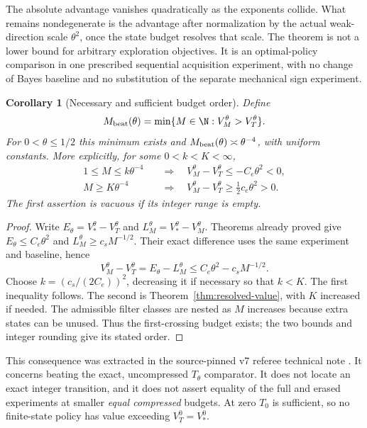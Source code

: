 \documentclass[11pt]{amsart}
\newtheorem{corollary}[theorem]{Corollary}
\theoremstyle{definition}\newtheorem{definition}[theorem]{Definition}
\theoremstyle{remark}\newtheorem{remark}[theorem]{Remark}
\begin{document}
The absolute advantage vanishes quadratically as the exponents collide.
What remains nondegenerate is the advantage after normalization by the
actual weak-direction scale $\theta^2$, once the state budget resolves
that scale. The theorem is not a lower bound for arbitrary exploration
objectives. It is an optimal-policy comparison in one prescribed
sequential acquisition experiment, with no change of Bayes baseline and
no substitution of the separate mechanical sign experiment.


\begin{corollary}[Necessary and sufficient budget order]\label{cor:necessary-budget}
Define
\[
 M_{\rm beat}(\theta)=\min\{M\in\N:V_M^\theta>V_T^\theta\}.
\]
For $0<\theta\le1/2$ this minimum exists and
$M_{\rm beat}(\theta)\asymp\theta^{-4}$, with uniform constants.
More explicitly, for some $0<k<K<\infty$,
\[
 \begin{aligned}
 1\le M\le k\theta^{-4}&\quad\Longrightarrow\quad
 V_M^\theta-V_T^\theta\le-C_e\theta^2<0,\\
 M\ge K\theta^{-4}&\quad\Longrightarrow\quad
 V_M^\theta-V_T^\theta\ge\tfrac12c_e\theta^2>0.
 \end{aligned}
\]
The first assertion is vacuous if its integer range is empty.
\end{corollary}
\begin{proof}
Write $E_\theta=V_*^\theta-V_T^\theta$ and
$L_M^\theta=V_*^\theta-V_M^\theta$. Theorems already proved give
$E_\theta\le C_e\theta^2$ and $L_M^\theta\ge c_sM^{-1/2}$.
Their exact difference uses the same experiment and baseline, hence
\[
 V_M^\theta-V_T^\theta=E_\theta-L_M^\theta
             \le C_e\theta^2-c_sM^{-1/2}.
\]
Choose $k=(c_s/(2C_e))^2$, decreasing it if necessary so that $k<K$.
The first inequality follows. The second is
Theorem~\ref{thm:resolved-value}, with $K$ increased if needed.
The admissible filter classes are nested as $M$ increases because extra
states can be unused. Thus the first-crossing budget exists; the two
bounds and integer rounding give its stated order.
\end{proof}

This consequence was extracted in the source-pinned v7 referee technical
note \cite{A1v7note}. It concerns beating the exact, uncompressed
$T_\theta$ comparator. It does not locate an exact integer transition,
and it does not assert equality of the full and erased experiments at
smaller \emph{equal compressed} budgets. At zero $T_0$ is sufficient,
so no finite-state policy has value exceeding $V_T^0=V_*^0$.
\end{document}
